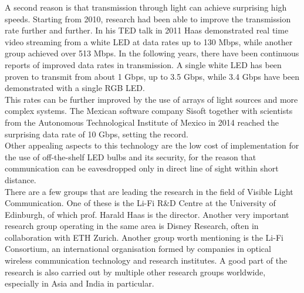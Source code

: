 A second reason is that transmission through light can achieve surprising high speeds.
Starting from 2010, research had been able to improve the transmission rate further and further.
In his TED talk in 2011 Haas demonstrated real time video streaming from a white LED at data rates up to 130 Mbps\cite{tedtalk}, while another group achieved over 513 Mbps\cite{500Mbps}.
In the following years, there have been continuous reports of improved data rates in transmission.
A single white LED has been proven to transmit from about 1 Gbps\cite{1Gbps}, up to 3.5 Gbps\cite{3.5Gbps}, while 3.4 Gbps have been demonstrated with a single RGB LED\cite{3.4Gbps}.\\
This rates can be further improved by the use of arrays of light sources and more complex systems.
The Mexican software company Sisoft together with scientists from the Autonomous Technological
Institute of Mexico in 2014 reached the surprising data rate of 10 Gbps, setting the record.\\
Other appealing aspects to this technology are the low cost of implementation for the use of off-the-shelf LED bulbs and its security, for the reason that communication can be eavesdropped only in direct line of sight within short distance.\\
 
There are a few groups that are leading the research in the field of Visible Light Communication.
One of these is the Li-Fi R\&D Centre at the University of Edinburgh, of which prof. Harald Haas is the director.
Another very important research group operating in the same area is Disney Research, often in collaboration with ETH Zurich.
Another group worth mentioning is the Li-Fi Consortium, an international organisation formed by companies in optical wireless communication technology and research institutes.
A good part of the research is also carried out by multiple other research groups worldwide, especially in Asia and India in particular.


